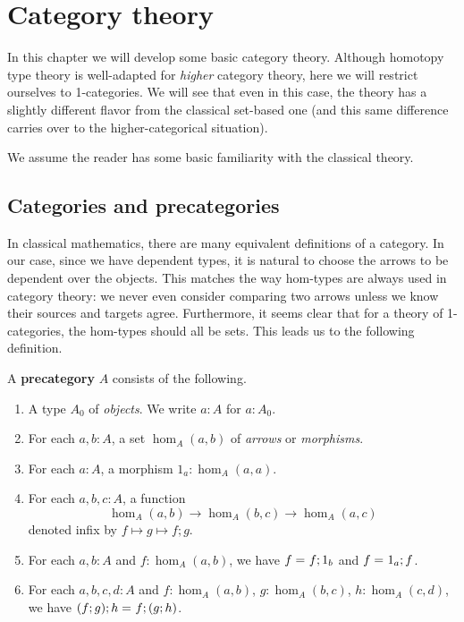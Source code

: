 \newcommand{\uset}{\ensuremath{\underline{\set}}\xspace}
\newcommand{\inv}[1]{{#1}^{-1}}
\newcommand{\idtoiso}{\ensuremath{\mathsf{idtoiso}}\xspace}
\newcommand{\isotoid}{\ensuremath{\mathsf{isotoid}}\xspace}

\chapter{Category theory}
\label{cha:category-theory}

In this chapter we will develop some basic category theory.  Although homotopy type theory is well-adapted for \emph{higher} category theory, here we will restrict ourselves to 1-categories.  We will see that even in this case, the theory has a slightly different flavor from the classical set-based one (and this same difference carries over to the higher-categorical situation).

We assume the reader has some basic familiarity with the classical theory.


\section{Categories and precategories}
\label{sec:cats}

In classical mathematics, there are many equivalent definitions of a category.  In our case, since we have dependent types, it is natural to choose the arrows to be dependent over the objects.  This matches the way hom-types are always used in category theory: we never even consider comparing two arrows unless we know their sources and targets agree.  Furthermore, it seems clear that for a theory of 1-categories, the hom-types should all be sets.  This leads us to the following definition.

\begin{defn}\label{ct:precategory}
  A \textbf{precategory} $A$ consists of the following.
  \begin{enumerate}
  \item A type $A_0$ of \emph{objects}.  We write $a:A$ for $a:A_0$.
  \item For each $a,b:A$, a set $\hom_A(a,b)$ of \emph{arrows} or \emph{morphisms}.
  \item For each $a:A$, a morphism $1_a:\hom_A(a,a)$.
  \item For each $a,b,c:A$, a function
    \[  \hom_A(a,b) \to \hom_A(b,c) \to \hom_A(a,c) \]
    denoted infix by $f\mapsto g\mapsto f;g$.
  \item For each $a,b:A$ and $f:\hom_A(a,b)$, we have $f =_{} f;1_b$ and $f =_{} 1_a;f$.
  \item For each $a,b,c,d:A$ and $f:\hom_A(a,b)$, $g:\hom_A(b,c)$, $h:\hom_A(c,d)$, we have $(f;g);h =_{} f;(g;h)$.
  \end{enumerate}
\end{defn}

